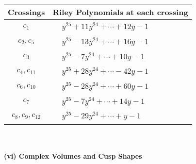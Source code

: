 \documentclass[1p]{elsarticle_modified}
\theoremstyle{definition}
\begin{document}
\begin{tabular}{m{50pt}|m{274pt}}
Crossings & \hspace{64pt}Riley Polynomials at each crossing \\
\hline $$\begin{aligned}c_{1}\end{aligned}$$&$\begin{aligned}
&y^{25}+11 y^{24}+\cdots+12 y-1
\end{aligned}$\\
\hline $$\begin{aligned}c_{2},c_{5}\end{aligned}$$&$\begin{aligned}
&y^{25}-13 y^{24}+\cdots+16 y-1
\end{aligned}$\\
\hline $$\begin{aligned}c_{3}\end{aligned}$$&$\begin{aligned}
&y^{25}-7 y^{24}+\cdots+10 y-1
\end{aligned}$\\
\hline $$\begin{aligned}c_{4},c_{11}\end{aligned}$$&$\begin{aligned}
&y^{25}+28 y^{24}+\cdots-42 y-1
\end{aligned}$\\
\hline $$\begin{aligned}c_{6},c_{10}\end{aligned}$$&$\begin{aligned}
&y^{25}-28 y^{24}+\cdots+60 y-1
\end{aligned}$\\
\hline $$\begin{aligned}c_{7}\end{aligned}$$&$\begin{aligned}
&y^{25}-7 y^{24}+\cdots+14 y-1
\end{aligned}$\\
\hline $$\begin{aligned}c_{8},c_{9},c_{12}\end{aligned}$$&$\begin{aligned}
&y^{25}-29 y^{24}+\cdots+y-1
\end{aligned}$\\
\hline
\end{tabular}\\~\\
\newpage\flushleft \textbf{(vi) Complex Volumes and Cusp Shapes}
\end{document}
